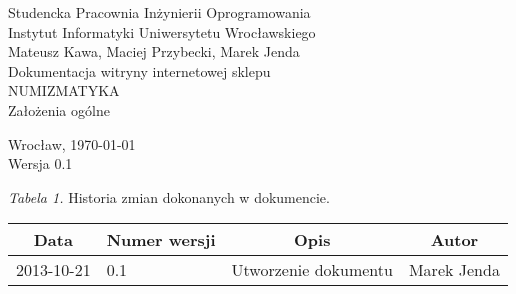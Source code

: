\documentclass [11pt, a4paper, leqno]	{article}	%
\begin{document}

\begin{center}
	\thispagestyle{empty} 							%
	{\large Studencka Pracownia Inżynierii Oprogramowania} 		\\ [0.5cm]
	{\large Instytut Informatyki Uniwersytetu Wrocławskiego} 	\\ [6.0cm]

	{\large Mateusz Kawa, Maciej Przybecki, Marek Jenda} 		\\ [1.5cm]

	{\huge Dokumentacja witryny internetowej sklepu} 			\\ [0.5cm]
	{\huge NUMIZMATYKA} 										\\ [1.5cm]

	{\large Założenia ogólne} 									\\ [0.5cm]

	\vfill
	
	{\large Wrocław, \today}									\\ [0.5cm]
	{\large Wersja 0.1}
\end{center}

\newpage


\textit{Tabela 1.} Historia zmian dokonanych w dokumencie.

\begin{center}
	\begin{tabular}{| l | l | l | l |}
		\hline
		\multicolumn{1}{|c|}{Data} & 
		\multicolumn{1}{|c|}{Numer wersji} &  
		\multicolumn{1}{|c|}{Opis} &
		\multicolumn{1}{|c|}{Autor} \\ \hline \hline
		2013-10-21 & 0.1 & Utworzenie dokumentu & Marek Jenda \\ \hline
	\end{tabular}
\end{center}
\newpage
\end{document}
